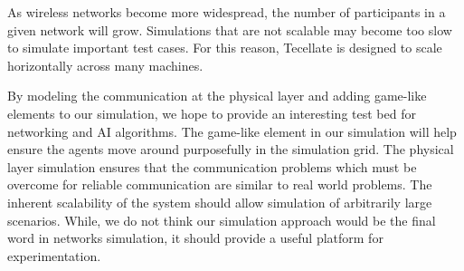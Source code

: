 \documentclass[12pt]{article}
\begin{document}
As wireless networks become more widespread, the number of participants in a given network will
grow. Simulations that are not scalable may become too slow to simulate important test cases. For
this reason, Tecellate is designed to scale horizontally across many machines.

By modeling the communication at the physical layer and adding game-like elements to our simulation,
we hope to provide an interesting test bed for networking and AI algorithms. The game-like element
in our simulation will help ensure the agents move around purposefully in the simulation grid. The
physical layer simulation ensures that the communication problems which must be overcome for
reliable communication are similar to real world problems. The inherent scalability of the system
should allow simulation of arbitrarily large scenarios. While, we do not think our simulation
approach would be the final word in networks simulation, it should provide a useful platform for
experimentation.













\nocite{*}


\end{document}
